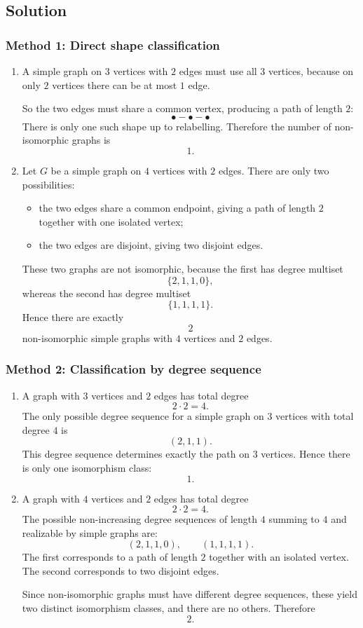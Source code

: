 \documentclass[12pt]{article}
\begin{document}
\subsection{Solution}

\subsubsection{Method 1: Direct shape classification}
\begin{enumerate}[label=(\alph*)]
\item A simple graph on \(3\) vertices with \(2\) edges must use all \(3\) vertices, because on only \(2\) vertices there can be at most \(1\) edge.

So the two edges must share a common vertex, producing a path of length \(2\):
\[
\bullet - \bullet - \bullet
\]
There is only one such shape up to relabelling. Therefore the number of non-isomorphic graphs is
\[
\boxed{1.}
\]

\item Let \(G\) be a simple graph on \(4\) vertices with \(2\) edges. There are only two possibilities:
\begin{itemize}[leftmargin=*]
  \item the two edges share a common endpoint, giving a path of length \(2\) together with one isolated vertex;
  \item the two edges are disjoint, giving two disjoint edges.
\end{itemize}
These two graphs are not isomorphic, because the first has degree multiset
\[
\{2,1,1,0\},
\]
whereas the second has degree multiset
\[
\{1,1,1,1\}.
\]
Hence there are exactly
\[
\boxed{2}
\]
non-isomorphic simple graphs with \(4\) vertices and \(2\) edges.
\end{enumerate}

\subsubsection{Method 2: Classification by degree sequence}
\begin{enumerate}[label=(\alph*)]
\item A graph with \(3\) vertices and \(2\) edges has total degree
\[
2\cdot 2=4.
\]
The only possible degree sequence for a simple graph on \(3\) vertices with total degree \(4\) is
\[
(2,1,1).
\]
This degree sequence determines exactly the path on \(3\) vertices. Hence there is only one isomorphism class:
\[
\boxed{1.}
\]

\item A graph with \(4\) vertices and \(2\) edges has total degree
\[
2\cdot 2=4.
\]
The possible non-increasing degree sequences of length \(4\) summing to \(4\) and realizable by simple graphs are:
\[
(2,1,1,0),\qquad (1,1,1,1).
\]
The first corresponds to a path of length \(2\) together with an isolated vertex. The second corresponds to two disjoint edges.

Since non-isomorphic graphs must have different degree sequences, these yield two distinct isomorphism classes, and there are no others. Therefore
\[
\boxed{2.}
\]
\end{enumerate}
\end{document}
